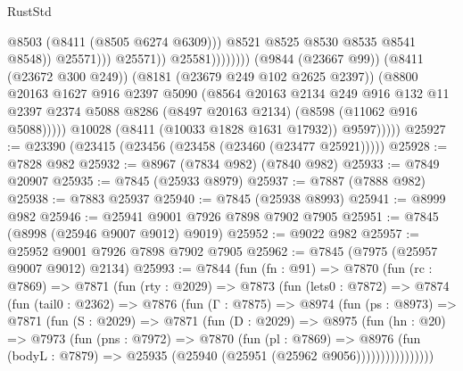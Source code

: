 \begin{lexlean}{RustStd}
\begin{coremodule}
                                                @8503
                                                (@8411 (@8505 @6274 @6309)))
                                              @8521
                                              @8525
                                              @8530
                                              @8535
                                              @8541
                                              @8548))
                                          @25571)))
                                    @25571))
                                @25581))))))))
                (@9844 (@23667 @99))
                (@8411 (@23672 @300 @249))
                (@8181 (@23679 @249 @102 @2625 @2397))
                (@8800
                  @20163
                  @1627
                  @916
                  @2397
                  @5090
                  (@8564
                    @20163
                    @2134
                    @249
                    @916
                    @132
                    @11
                    @2397
                    @2374
                    @5088
                    @8286
                    (@8497 @20163 @2134)
                    (@8598 (@11062 @916 @5088)))))
              @10028
              (@8411 (@10033 @1828 @1631 @17932))
              @9597)))))
@25927 := @23390 (@23415 (@23456 (@23458 (@23460 (@23477 @25921)))))
@25928 := @7828 @982
@25932 := @8967 (@7834 @982) (@7840 @982)
@25933 := @7849 @20907
@25935 := @7845 (@25933 @8979)
@25937 := @7887 (@7888 @982)
@25938 := @7883 @25937
@25940 := @7845 (@25938 @8993)
@25941 := @8999 @982
@25946 := @25941 @9001 @7926 @7898 @7902 @7905
@25951 := @7845 (@8998 (@25946 @9007 @9012) @9019)
@25952 := @9022 @982
@25957 := @25952 @9001 @7926 @7898 @7902 @7905
@25962 := @7845 (@7975 (@25957 @9007 @9012) @2134)
@25993 := @7844
    (fun (fn : @91) =>
    @7870
      (fun (rc : @7869) =>
      @7871
        (fun (rty : @2029) =>
        @7873
          (fun (lets0 : @7872) =>
          @7874
            (fun (tail0 : @2362) =>
            @7876
              (fun (Γ : @7875) =>
              @8974
                (fun (ps : @8973) =>
                @7871
                  (fun (S : @2029) =>
                  @7871
                    (fun (D : @2029) =>
                    @8975
                      (fun (hn : @20) =>
                      @7973
                        (fun (pns : @7972) =>
                        @7870
                          (fun (pl : @7869) =>
                          @8976
                            (fun (bodyL : @7879) =>
                            @25935 (@25940 (@25951 (@25962 @9056))))))))))))))))

\end{coremodule}
\end{lexlean}
